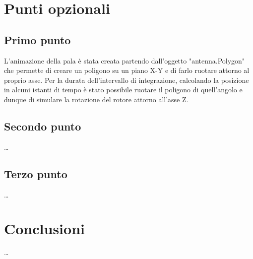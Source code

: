 \documentclass[a4paper, 11pt]{article}
\begin{document}
\section{Punti opzionali}

\subsection{Primo punto}

L'animazione della pala è stata creata partendo dall'oggetto "antenna.Polygon" che permette di creare un poligono su un piano X-Y e di farlo ruotare attorno al proprio asse. Per la durata dell'intervallo di integrazione, calcolando la posizione in alcuni istanti di tempo è stato possibile ruotare il poligono di quell'angolo e dunque di simulare la rotazione del rotore attorno all'asse Z.


\subsection{Secondo punto}

\dots

\subsection{Terzo punto}

\dots

\section{Conclusioni}

\dots
\end{document}
